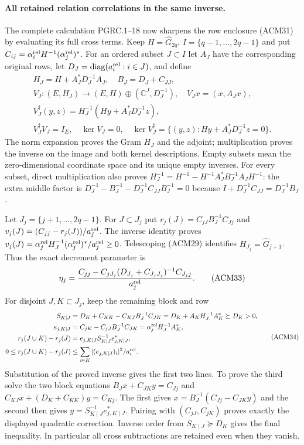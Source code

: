 \paragraph{All retained relation correlations in the same inverse.}
The complete calculation PGRC.1--18 now sharpens the row enclosure
(ACM31) by evaluating its full cross terms. Keep
$H=\widehat G_{2q}$, $I=\{q-1,\ldots,2q-1\}$ and put
$C_{ij}=\alpha_i^{\rm rel}H^{-1}(\alpha_j^{\rm rel})^*$.
For an ordered subset $J\subset I$ let $A_J$ have the corresponding
original rows, let $D_J=\operatorname{diag}(a_i^{\rm rel}:i\in J)$,
and define
\[
\begin{gathered}
 H_J=H+A_J^*D_J^{-1}A_J,\quad B_J=D_J+C_{JJ},\\
 V_J:(E,H_J)\longrightarrow(E,H)\oplus(\mathbb C^J,D_J^{-1}),
 \quad V_Jx=(x,A_Jx),\\
 V_J^\dagger(y,z)=H_J^{-1}(Hy+A_J^*D_J^{-1}z),\\
 V_J^\dagger V_J=I_E,\quad\ker V_J=0,\quad
 \ker V_J^\dagger=\{(y,z):Hy+A_J^*D_J^{-1}z=0\}.
\end{gathered}\tag{ACM32}
\]
The norm expansion proves the Gram $H_J$ and the adjoint;
multiplication proves the inverse on the image and both kernel
descriptions. Empty subsets mean the zero-dimensional coordinate
space and its unique empty inverses. For every subset, direct
multiplication also proves
$H_J^{-1}=H^{-1}-H^{-1}A_J^*B_J^{-1}A_JH^{-1}$:
the extra middle factor is
$D_J^{-1}-B_J^{-1}-D_J^{-1}C_{JJ}B_J^{-1}=0$
because $I+D_J^{-1}C_{JJ}=D_J^{-1}B_J$.

Let $J_j=\{j+1,\ldots,2q-1\}$. For $J\subset J_j$ put
$r_j(J)=C_{jJ}B_J^{-1}C_{Jj}$ and
$v_j(J)=(C_{jj}-r_j(J))/a_j^{\rm rel}$.
The inverse identity proves
$v_j(J)=\alpha_j^{\rm rel}H_J^{-1}(\alpha_j^{\rm rel})^*/a_j^{\rm rel}
\geq0$. Telescoping (ACM29) identifies
$H_{J_j}=\widehat G_{j+1}$. Thus the exact decrement parameter is
\[
 \eta_j=
 \frac{C_{jj}-C_{jJ_j}(D_{J_j}+C_{J_jJ_j})^{-1}C_{J_jj}}
      {a_j^{\rm rel}}.
 \tag{ACM33}
\]
For disjoint $J,K\subset J_j$, keep the remaining block and row
\[
\begin{aligned}
 S_{K\mid J}&=D_K+C_{KK}-C_{KJ}B_J^{-1}C_{JK}
             =D_K+A_KH_J^{-1}A_K^*\succeq D_K>0,\\
 e_{j,K\mid J}&=C_{jK}-C_{jJ}B_J^{-1}C_{JK}
                =\alpha_j^{\rm rel}H_J^{-1}A_K^*,\\
 r_j(J\cup K)-r_j(J)&=e_{j,K\mid J}S_{K\mid J}^{-1}e_{j,K\mid J}^*,\\
 0\leq r_j(J\cup K)-r_j(J)
 &\leq\sum_{i\in K}|(e_{j,K\mid J})_i|^2/a_i^{\rm rel}.
\end{aligned}\tag{ACM34}
\]
Substitution of the proved inverse gives the first two lines.
To prove the third solve the two block equations
$B_Jx+C_{JK}y=C_{Jj}$ and
$C_{KJ}x+(D_K+C_{KK})y=C_{Kj}$.
The first gives $x=B_J^{-1}(C_{Jj}-C_{JK}y)$ and the second
then gives $y=S_{K\mid J}^{-1}e_{j,K\mid J}^*$.
Pairing with $(C_{jJ},C_{jK})$ proves exactly the displayed
quadratic correction. Inverse order from $S_{K\mid J}\succeq D_K$
gives the final inequality. In particular all cross subtractions
are retained even when they vanish.

